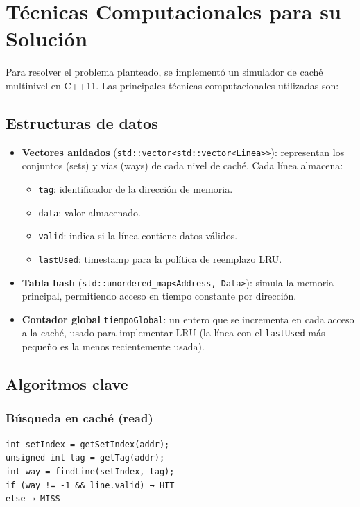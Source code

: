 \documentclass[12pt, letterpaper]{article}
\begin{document}
\section{Técnicas Computacionales para su Solución}

Para resolver el problema planteado, se implementó un simulador de caché multinivel en C++11. Las principales técnicas computacionales utilizadas son:

\subsection{Estructuras de datos}

\begin{itemize}
    \item \textbf{Vectores anidados} (\texttt{std::vector<std::vector<Linea>>}): representan los conjuntos (sets) y vías (ways) de cada nivel de caché. Cada línea almacena:
    \begin{itemize}
        \item \texttt{tag}: identificador de la dirección de memoria.
        \item \texttt{data}: valor almacenado.
        \item \texttt{valid}: indica si la línea contiene datos válidos.
        \item \texttt{lastUsed}: timestamp para la política de reemplazo LRU.
    \end{itemize}
    \item \textbf{Tabla hash} (\texttt{std::unordered\_map<Address, Data>}): simula la memoria principal, permitiendo acceso en tiempo constante por dirección.
    \item \textbf{Contador global} \texttt{tiempoGlobal}: un entero que se incrementa en cada acceso a la caché, usado para implementar LRU (la línea con el \texttt{lastUsed} más pequeño es la menos recientemente usada).
\end{itemize}

\subsection{Algoritmos clave}

\subsubsection{Búsqueda en caché (read)}

\begin{lstlisting}
int setIndex = getSetIndex(addr);
unsigned int tag = getTag(addr);
int way = findLine(setIndex, tag);
if (way != -1 && line.valid) → HIT
else → MISS
\end{lstlisting}
\end{document}
